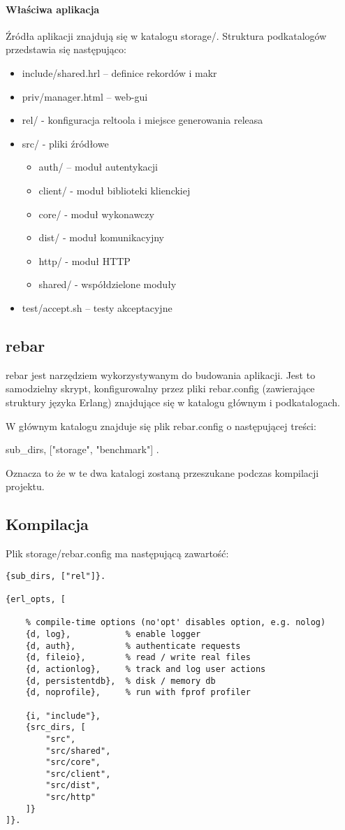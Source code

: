 \paragraph{Właściwa aplikacja} Źródła aplikacji znajdują się w katalogu storage/. Struktura podkatalogów przedstawia się następująco:
\begin{itemize}
	\item include/shared.hrl – definice rekordów i makr
	\item priv/manager.html – web-gui
	\item rel/ - konfiguracja reltoola i miejsce generowania releasa
	\item src/ - pliki źródłowe
	\begin{itemize}
		\item auth/ – moduł autentykacji
		\item client/ - moduł biblioteki klienckiej
		\item core/ - moduł wykonawczy
		\item dist/ - moduł komunikacyjny
		\item http/ - moduł HTTP
		\item shared/ - współdzielone moduły
	\end{itemize}
	\item test/accept.sh – testy akceptacyjne
\end{itemize}


\subsection{rebar}
rebar jest narzędziem wykorzystywanym do budowania aplikacji. Jest to samodzielny skrypt, konfigurowalny przez pliki rebar.config (zawierające struktury języka Erlang) znajdujące się w katalogu głównym i podkatalogach.

W głównym katalogu znajduje się plik rebar.config o następującej treści:

{sub\_dirs, ["storage", "benchmark"] }.

Oznacza to że w te dwa katalogi zostaną przeszukane podczas kompilacji projektu.


\subsection{Kompilacja}
Plik storage/rebar.config ma następującą zawartość:
\begin{lstlisting}
{sub_dirs, ["rel"]}.

{erl_opts, [

	% compile-time options (no'opt' disables option, e.g. nolog)
	{d, log}, 			% enable logger
	{d, auth}, 			% authenticate requests
	{d, fileio}, 		% read / write real files
	{d, actionlog}, 	% track and log user actions
	{d, persistentdb}, 	% disk / memory db
	{d, noprofile}, 	% run with fprof profiler

	{i, "include"},
	{src_dirs, [
		"src",
		"src/shared",
		"src/core",
		"src/client",
		"src/dist",
		"src/http"
	]}
]}.
\end{lstlisting}

